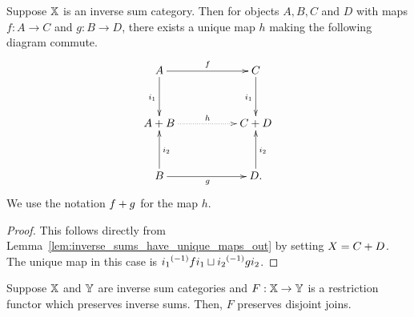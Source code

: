 \begin{corollary}\label{cor:inverse_sums_have_unique_maps}
  Suppose $\mathbb{X}$ is an inverse sum category. Then for objects $A,B,C$ and $D$ with maps $f:A\to C$
  and $g:B\to D$, there exists a unique map $h$ making the following diagram commute.
  \[
    \xymatrix@R+10pt@C+28pt {
      A \ar[r]^{f} \ar[d]_{i_1}
        & C \ar[d]_{i_1} \\
      \invsum{A}{B} \ar@{.>}[r]^{h}
        & \invsum{C}{D}\\
      B \ar[r]_{g} \ar[u]_{i_2}
        & D \ar[u]_{i_2}\text{.}
    }
  \]
  We use the notation ${{f}+{g}}$ for the map $h$.
\end{corollary}
\begin{proof}
  This follows directly from Lemma~\ref{lem:inverse_sums_have_unique_maps_out} by setting
  $X = {{C}+{D}}$. The unique map in this case is ${i_1}^{(-1)} f i_1 \sqcup {i_2}^{(-1)} g i_2$.
\end{proof}
\begin{lemma}\label{lem:functor_preserving_inverse_sums_preserves_joins}
  Suppose $\mathbb{X}$ and $\mathbb{Y}$ are inverse sum categories and $F:\mathbb{X} \to \mathbb{Y}$ is a restriction functor which
  preserves inverse sums. Then, $F$ preserves disjoint joins.
\end{lemma}
